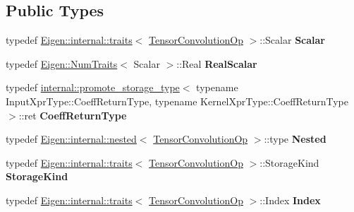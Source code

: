 \subsection*{Public Types}
\begin{DoxyCompactItemize}
\item 
\mbox{\label{class_eigen_1_1_tensor_convolution_op_a27d002a13325d32a55eceee039ec73dc}} 
typedef \hyperlink{struct_eigen_1_1internal_1_1traits}{Eigen\+::internal\+::traits}$<$ \hyperlink{class_eigen_1_1_tensor_convolution_op}{Tensor\+Convolution\+Op} $>$\+::Scalar {\bfseries Scalar}
\item 
\mbox{\label{class_eigen_1_1_tensor_convolution_op_a9514f129b39caff0315cdcebb4ae847c}} 
typedef \hyperlink{group___core___module_struct_eigen_1_1_num_traits}{Eigen\+::\+Num\+Traits}$<$ Scalar $>$\+::Real {\bfseries Real\+Scalar}
\item 
\mbox{\label{class_eigen_1_1_tensor_convolution_op_a6dfdaa2cd15b992e16d1c633abd1f075}} 
typedef \hyperlink{struct_eigen_1_1internal_1_1promote__storage__type}{internal\+::promote\+\_\+storage\+\_\+type}$<$ typename Input\+Xpr\+Type\+::\+Coeff\+Return\+Type, typename Kernel\+Xpr\+Type\+::\+Coeff\+Return\+Type $>$\+::ret {\bfseries Coeff\+Return\+Type}
\item 
\mbox{\label{class_eigen_1_1_tensor_convolution_op_a827fd3d828f9da2138d313db48608473}} 
typedef \hyperlink{struct_eigen_1_1internal_1_1nested}{Eigen\+::internal\+::nested}$<$ \hyperlink{class_eigen_1_1_tensor_convolution_op}{Tensor\+Convolution\+Op} $>$\+::type {\bfseries Nested}
\item 
\mbox{\label{class_eigen_1_1_tensor_convolution_op_a3a4c61d4b411df393efdd3c65e9f0f61}} 
typedef \hyperlink{struct_eigen_1_1internal_1_1traits}{Eigen\+::internal\+::traits}$<$ \hyperlink{class_eigen_1_1_tensor_convolution_op}{Tensor\+Convolution\+Op} $>$\+::Storage\+Kind {\bfseries Storage\+Kind}
\item 
\mbox{\label{class_eigen_1_1_tensor_convolution_op_a1b7f2ba89d147722e7e6f37d6bc2eab7}} 
typedef \hyperlink{struct_eigen_1_1internal_1_1traits}{Eigen\+::internal\+::traits}$<$ \hyperlink{class_eigen_1_1_tensor_convolution_op}{Tensor\+Convolution\+Op} $>$\+::Index {\bfseries Index}

\end{DoxyCompactItemize}
